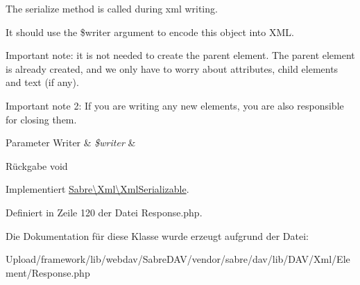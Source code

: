 The serialize method is called during xml writing.

It should use the \$writer argument to encode this object into X\+ML.

Important note\+: it is not needed to create the parent element. The parent element is already created, and we only have to worry about attributes, child elements and text (if any).

Important note 2\+: If you are writing any new elements, you are also responsible for closing them.


\begin{DoxyParams}[1]{Parameter}
Writer & {\em \$writer} & \\
\hline
\end{DoxyParams}
\begin{DoxyReturn}{Rückgabe}
void 
\end{DoxyReturn}


Implementiert \mbox{\hyperlink{interface_sabre_1_1_xml_1_1_xml_serializable_aa78f3ee43aa699be8347181653a53d8c}{Sabre\textbackslash{}\+Xml\textbackslash{}\+Xml\+Serializable}}.



Definiert in Zeile 120 der Datei Response.\+php.



Die Dokumentation für diese Klasse wurde erzeugt aufgrund der Datei\+:\begin{DoxyCompactItemize}
\item 
Upload/framework/lib/webdav/\+Sabre\+D\+A\+V/vendor/sabre/dav/lib/\+D\+A\+V/\+Xml/\+Element/Response.\+php\end{DoxyCompactItemize}

